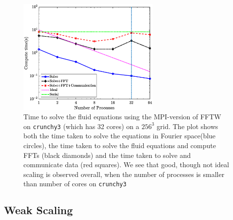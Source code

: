 \documentclass[]{article}
\begin{document}
\begin{figure}
	\centering     
	\includegraphics[width=70mm]{StrMPI.eps}
\caption{Time to solve the fluid equations using the MPI-version of FFTW on \texttt{crunchy3} (which has 32 cores) on a $256^3$ grid. The plot shows both the time taken to solve the equations in Fourier space(blue circles), the time taken to solve the fluid equations and compute FFTs (black diamonds) and the time taken to solve and communicate data (red squares). We see that good, though not ideal scaling is observed overall, when the number of processes is smaller than number of cores on \texttt{crunchy3}}
\label{fig:StrongMPI}
\end{figure}
\subsection{Weak Scaling}
\end{document}
